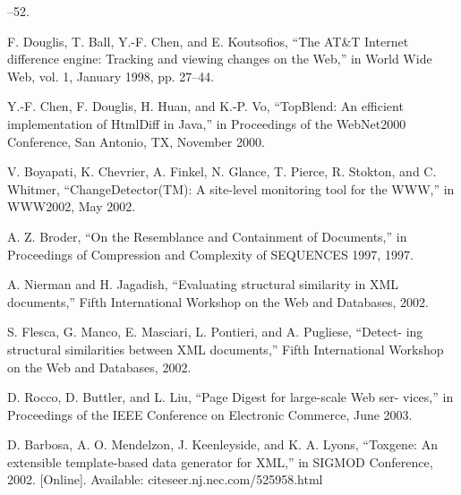 \begin{enumerate}[{[}1{]}]
  –52.
\item F. Douglis, T. Ball, Y.-F. Chen, and E. Koutsofios, “The AT\&T Internet
  difference engine: Tracking and viewing changes on the Web,” in World Wide
  Web, vol. 1, January 1998, pp. 27–44.
\item Y.-F. Chen, F. Douglis, H. Huan, and K.-P. Vo, “TopBlend: An efficient
  implementation of HtmlDiff in Java,” in Proceedings of the WebNet2000
  Conference, San Antonio, TX, November 2000.
\item V. Boyapati, K. Chevrier, A. Finkel, N. Glance, T. Pierce, R. Stokton, and
  C. Whitmer, “ChangeDetector(TM): A site-level monitoring tool for the WWW,”
  in WWW2002, May 2002.
\item A. Z. Broder, “On the Resemblance and Containment of Documents,” in
  Proceedings of Compression and Complexity of SEQUENCES 1997, 1997.
\item A. Nierman and H. Jagadish, “Evaluating structural similarity in XML
  documents,” Fifth International Workshop on the Web and Databases, 2002.
\item S. Flesca, G. Manco, E. Masciari, L. Pontieri, and A. Pugliese, “Detect-
  ing structural similarities between XML documents,” Fifth International
  Workshop on the Web and Databases, 2002.
\item D. Rocco, D. Buttler, and L. Liu, “Page Digest for large-scale Web ser-
  vices,” in Proceedings of the IEEE Conference on Electronic Commerce, June
  2003.
\item D. Barbosa, A. O. Mendelzon, J. Keenleyside, and K. A. Lyons, “Toxgene:
  An extensible template-based data generator for XML,” in SIGMOD Conference,
  2002. [Online]. Available: citeseer.nj.nec.com/525958.html
\end{enumerate}
